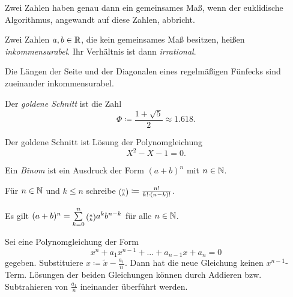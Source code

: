\documentclass{cheat-sheet}
\let\myBinom\binom
\renewcommand{\binom}[2]{\mathsmaller{\myBinom{#1}{#2}}}
\begin{document}
\begin{bem}
  Zwei Zahlen haben genau dann ein gemeinsames Maß, wenn der euklidische Algorithmus, angewandt auf diese Zahlen, abbricht.
\end{bem}

\begin{defn}
  Zwei Zahlen $a, b \in \mathbb{R}$, die kein gemeinsames Maß besitzen, heißen \emph{inkommensurabel}. Ihr Verhältnis ist dann \emph{irrational}.
\end{defn}

\begin{satz}
  Die Längen der Seite und der Diagonalen eines regelmäßigen Fünfecks sind zueinander inkommensurabel.
\end{satz}

\begin{defn}
  Der \emph{goldene Schnitt} ist die Zahl
  \[ \Phi \coloneqq \frac{1 + \sqrt{5}}{2} \approx 1.618. \]
\end{defn}

\begin{bem}
  Der goldene Schnitt ist Lösung der Polynomgleichung
  \[ X^2 - X - 1 = 0. \]
\end{bem}



\begin{defn}
  Ein \emph{Binom} ist ein Ausdruck der Form $(a+b)^n$ mit $n \in \mathbb{N}$.
\end{defn}

\begin{defn}
  Für $n \in \mathbb{N}$ und $k \leq n$ schreibe $\binom{n}{k} \coloneqq \tfrac{n!}{k! \cdot (n-k)!}$.
\end{defn}

\begin{satz}
  Es gilt $(a+b)^n = \sum_{k=0}^n \binom{n}{k} a^k b^{n-k}$ für alle $n \in \mathbb{N}$.
\end{satz}


\begin{verf}
  Sei eine Polynomgleichung der Form
  \[ x^n + a_1 x^{n-1} + ... + a_{n-1} x + a_n = 0 \]
  gegeben. Substituiere $x \coloneqq \tilde{x} - \tfrac{a_1}{n}$. Dann hat die neue Gleichung keinen $x^{n-1}$-Term. Lösungen der beiden Gleichungen können durch Addieren bzw. Subtrahieren von $\tfrac{a_1}{n}$ ineinander überführt werden.
\end{verf}
\end{document}
